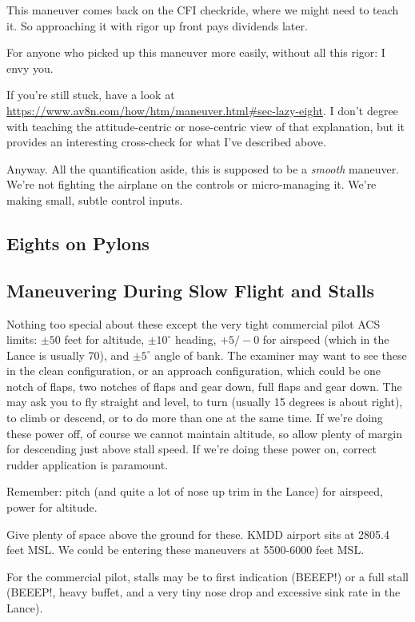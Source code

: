 This maneuver comes back on the CFI checkride, where we might need to teach it. So approaching it with rigor up front pays dividends later.

For anyone who picked up this maneuver more easily, without all this rigor: I envy you.

If you're still stuck, have a look at \url{https://www.av8n.com/how/htm/maneuver.html#sec-lazy-eight}. I don't degree with teaching the attitude-centric or nose-centric view of that explanation, but it provides an interesting cross-check for what I've described above.

Anyway. All the quantification aside, this is supposed to be a \emph{smooth} maneuver. We're not fighting the airplane on the controls or micro-managing it. We're making small, subtle control inputs.

\subsection{Eights on Pylons}

\subsection{Maneuvering During Slow Flight and Stalls}

Nothing too special about these except the very tight commercial pilot ACS limits: $\pm50$ feet for altitude, $\pm10^\circ$ heading, $+5/-0$ for airspeed (which in the Lance is usually 70), and $\pm5^\circ$ angle of bank. The examiner may want to see these in the clean configuration, or an approach configuration, which could be one notch of flaps, two notches of flaps and gear down, full flaps and gear down. The may ask you to fly straight and level, to turn (usually 15 degrees is about right), to climb or descend, or to do more than one at the same time. If we're doing these power off, of course we cannot maintain altitude, so allow plenty of margin for descending just above stall speed. If we're doing these power on, correct rudder application is paramount.

Remember: pitch (and quite a lot of nose up trim in the Lance) for airspeed, power for altitude.

Give plenty of space above the ground for these. KMDD airport sits at 2805.4 feet MSL. We could be entering these maneuvers at 5500-6000 feet MSL.

For the commercial pilot, stalls may be to first indication (BEEEP!) or a full stall (BEEEP!, heavy buffet, and a very tiny nose drop and excessive sink rate in the Lance).

